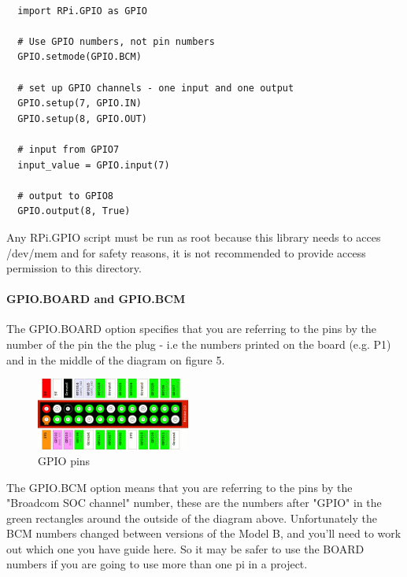 \documentclass{acm_proc_article-sp}
\begin{document}
\renewcommand{\theFancyVerbLine}{
  \sffamily\textcolor[rgb]{0.5,0.5,0.5}{\scriptsize\arabic{FancyVerbLine}}}
\begin{verbatim}

  import RPi.GPIO as GPIO

  # Use GPIO numbers, not pin numbers
  GPIO.setmode(GPIO.BCM) 

  # set up GPIO channels - one input and one output
  GPIO.setup(7, GPIO.IN) 
  GPIO.setup(8, GPIO.OUT)

  # input from GPIO7
  input_value = GPIO.input(7)

  # output to GPIO8
  GPIO.output(8, True)
\end{verbatim}
Any RPi.GPIO script must be run as root because this library needs to acces /dev/mem and for safety reasons, it is not recommended to provide access permission to this directory.



\paragraph{GPIO.BOARD and GPIO.BCM}
The GPIO.BOARD option specifies that you are referring to the pins by the number of the pin the the plug - i.e the numbers printed on the board (e.g. P1) and in the middle of the diagram on figure 5.
\begin{figure}[h]
    \includegraphics[width=0.45\textwidth,natwidth=610,natheight=642]{pictures/ModelAB.png}
    \caption{GPIO pins}
\end{figure}
\newline
\newline
The GPIO.BCM option means that you are referring to the pins by the "Broadcom SOC channel" number, these are the numbers after "GPIO" in the green rectangles around the outside of the diagram above.
\newline
\newline
Unfortunately the BCM numbers changed between versions of the Model B, and you'll need to work out which one you have guide here. So it may be safer to use the BOARD numbers if you are going to use more than one pi in a project.
\end{document}
